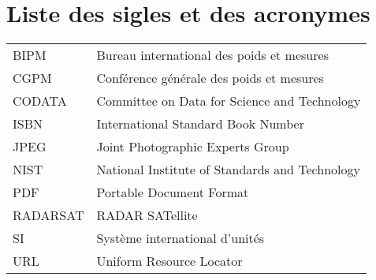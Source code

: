 
%
%

\chapter{Liste des sigles et des acronymes}


\begin{flushleft}
   \begin{tabular}{@{}ll}
		BIPM        & Bureau international des poids et mesures			\\
		CGPM        & Conférence générale des poids et mesures			\\
		CODATA      & Committee on Data for Science and Technology		\\
		ISBN        & International Standard Book Number				\\
		JPEG        & Joint Photographic Experts Group					\\
		NIST        & National Institute of Standards and Technology	\\
		PDF         & Portable Document Format							\\
		RADARSAT    & RADAR SATellite									\\
		SI          & Système international d'unités					\\
		URL         & Uniform Resource Locator							\\
   \end{tabular}
\end{flushleft}
